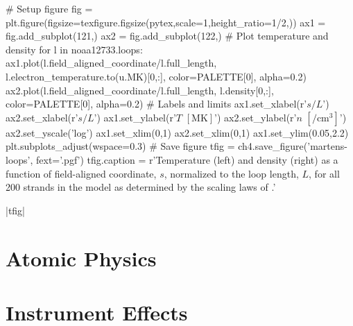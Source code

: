 \begin{pycode}[chapter4]
# Setup figure
fig = plt.figure(figsize=texfigure.figsize(pytex,scale=1,height_ratio=1/2,))
ax1 = fig.add_subplot(121,)
ax2 = fig.add_subplot(122,)
# Plot temperature and density
for l in noaa12733.loops:
    ax1.plot(l.field_aligned_coordinate/l.full_length,
             l.electron_temperature.to(u.MK)[0,:],
             color=PALETTE[0], alpha=0.2)
    ax2.plot(l.field_aligned_coordinate/l.full_length,
             l.density[0,:],
             color=PALETTE[0], alpha=0.2)
# Labels and limits
ax1.set_xlabel(r'$s/L$')
ax2.set_xlabel(r'$s/L$')
ax1.set_ylabel(r'$T$ $[\si{\mega\kelvin}]$')
ax2.set_ylabel(r'$n$ $[\si{\per\cubic\cm}]$')
ax2.set_yscale('log')
ax1.set_xlim(0,1)
ax2.set_xlim(0,1)
ax1.set_ylim(0.05,2.2)
plt.subplots_adjust(wspace=0.3)
# Save figure
tfig = ch4.save_figure('martens-loops', fext='.pgf')
tfig.caption = r'Temperature (left) and density (right) as a function of field-aligned coordinate, $s$, normalized to the loop length, $L$, for all 200 strands in the model \AR{} as determined by the scaling laws of \citet{martens_scaling_2010}.'
\end{pycode}
\py[chapter4]|tfig|

\section{Atomic Physics}


\section{Instrument Effects}

